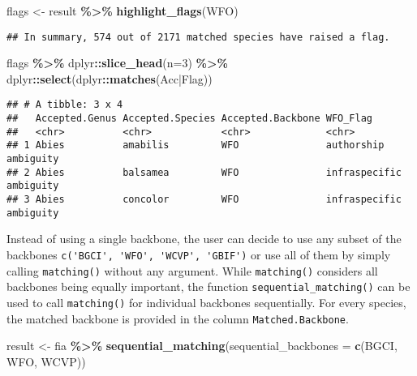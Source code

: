 \documentclass[
  11pt,
]{article}
\newenvironment{Shaded}{\begin{snugshade}}{\end{snugshade}}
\newcommand{\AttributeTok}[1]{\textcolor[rgb]{0.13,0.29,0.53}{#1}}
\newcommand{\DecValTok}[1]{\textcolor[rgb]{0.00,0.00,0.81}{#1}}
\newcommand{\FunctionTok}[1]{\textcolor[rgb]{0.13,0.29,0.53}{\textbf{#1}}}
\newcommand{\NormalTok}[1]{#1}
\newcommand{\OtherTok}[1]{\textcolor[rgb]{0.56,0.35,0.01}{#1}}
\newcommand{\SpecialCharTok}[1]{\textcolor[rgb]{0.81,0.36,0.00}{\textbf{#1}}}
\newcommand{\StringTok}[1]{\textcolor[rgb]{0.31,0.60,0.02}{#1}}
\begin{document}
\begin{Shaded}
\begin{Highlighting}[]
\NormalTok{flags }\OtherTok{\textless{}{-}}\NormalTok{ result }\SpecialCharTok{\%\textgreater{}\%} \FunctionTok{highlight\_flags}\NormalTok{(}\StringTok{\textquotesingle{}WFO\textquotesingle{}}\NormalTok{)}
\end{Highlighting}
\end{Shaded}

\begin{verbatim}
## In summary, 574 out of 2171 matched species have raised a flag.
\end{verbatim}

\begin{Shaded}
\begin{Highlighting}[]
\NormalTok{flags }\SpecialCharTok{\%\textgreater{}\%} 
\NormalTok{  dplyr}\SpecialCharTok{::}\FunctionTok{slice\_head}\NormalTok{(}\AttributeTok{n=}\DecValTok{3}\NormalTok{) }\SpecialCharTok{\%\textgreater{}\%} 
\NormalTok{  dplyr}\SpecialCharTok{::}\FunctionTok{select}\NormalTok{(dplyr}\SpecialCharTok{::}\FunctionTok{matches}\NormalTok{(}\StringTok{\textquotesingle{}Acc|Flag\textquotesingle{}}\NormalTok{))}
\end{Highlighting}
\end{Shaded}

\begin{verbatim}
## # A tibble: 3 x 4
##   Accepted.Genus Accepted.Species Accepted.Backbone WFO_Flag               
##   <chr>          <chr>            <chr>             <chr>                  
## 1 Abies          amabilis         WFO               authorship ambiguity   
## 2 Abies          balsamea         WFO               infraspecific ambiguity
## 3 Abies          concolor         WFO               infraspecific ambiguity
\end{verbatim}

\noindent Instead of using a single backbone, the user can decide to use
any subset of the backbones \verb|c('BGCI', 'WFO', 'WCVP', 'GBIF')| or
use all of them by simply calling \verb|matching()| without any
argument. While \verb|matching()| considers all backbones being equally
important, the function \verb|sequential_matching()| can be used to call
\verb|matching()| for individual backbones sequentially. For every
species, the matched backbone is provided in the column
\verb|Matched.Backbone|.

\begin{Shaded}
\begin{Highlighting}[]
\NormalTok{result }\OtherTok{\textless{}{-}}\NormalTok{ fia }\SpecialCharTok{\%\textgreater{}\%} 
  \FunctionTok{sequential\_matching}\NormalTok{(}\AttributeTok{sequential\_backbones =} \FunctionTok{c}\NormalTok{(}\StringTok{\textquotesingle{}BGCI\textquotesingle{}}\NormalTok{, }\StringTok{\textquotesingle{}WFO\textquotesingle{}}\NormalTok{, }\StringTok{\textquotesingle{}WCVP\textquotesingle{}}\NormalTok{))}
\end{Highlighting}
\end{Shaded}
\end{document}
